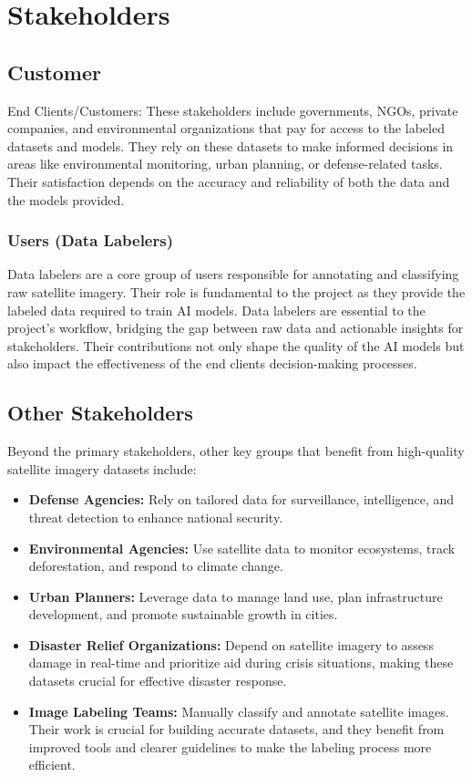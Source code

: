 \documentclass[12pt]{article}
\begin{document}
\section{Stakeholders}

\subsection{Customer}
End Clients/Customers: These stakeholders include governments, NGOs, private companies, and environmental organizations that pay for access to the labeled datasets and models. They rely on these datasets to make informed decisions in areas like environmental monitoring, urban planning, or defense-related tasks. Their satisfaction depends on the accuracy and reliability of both the data and the models provided.


\subsubsection{Users (Data Labelers)}
Data labelers are a core group of users responsible for annotating and classifying raw satellite imagery. Their role is fundamental to the project as they provide the labeled data required to train AI models. Data labelers are essential to the project's workflow, bridging the gap between raw data and actionable insights for stakeholders. Their contributions not only shape the quality of the AI models but also impact the effectiveness of the end clients decision-making processes.


\subsection{Other Stakeholders}
Beyond the primary stakeholders, other key groups that benefit from high-quality satellite imagery datasets include:
\begin{itemize}
    \item \textbf{Defense Agencies:} Rely on tailored data for surveillance, intelligence, and threat detection to enhance national security.
    \item \textbf{Environmental Agencies:} Use satellite data to monitor ecosystems, track deforestation, and respond to climate change.
    \item \textbf{Urban Planners:} Leverage data to manage land use, plan infrastructure development, and promote sustainable growth in cities.
    \item \textbf{Disaster Relief Organizations:} Depend on satellite imagery to assess damage in real-time and prioritize aid during crisis situations, making these datasets crucial for effective disaster response.
    \item \textbf{Image Labeling Teams:} Manually classify and annotate satellite images. Their work is crucial for building accurate datasets, and they benefit from improved tools and clearer guidelines to make the labeling process more efficient.
\end{itemize}
\end{document}
